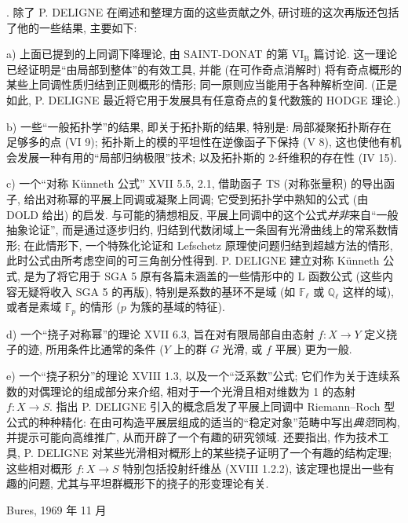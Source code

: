 . 除了 P. DELIGNE 在阐述和整理方面的这些贡献之外,
研讨班的这次再版还包括了他的一些结果, 主要如下:

\noindent a) 上面已提到的上同调下降理论,
由 SAINT-DONAT 的第 $\mathrm{VI}_{\mathrm B}$ 篇讨论.
这一理论已经证明是“由局部到整体”的有效工具,
并能 (在可作奇点消解时) 将有奇点概形的某些上同调性质归结到正则概形的情形;
同一原则应当能用于各种解析空间.
(正是如此, P. DELIGNE 最近将它用于发展具有任意奇点的复代数簇的 HODGE 理论.)

\noindent b) 一些“一般拓扑学”的结果, 即关于拓扑斯的结果, 特别是:
局部凝聚拓扑斯存在足够多的点 (VI 9);
拓扑斯上的模的平坦性在逆像函子下保持 (V 8),
这也使他有机会发展一种有用的“局部归纳极限”技术;
以及拓扑斯的 2-纤维积的存在性 (IV 15).

\noindent c) 一个“对称 Künneth 公式” XVII 5.5, 2.1,
借助函子 TS (对称张量积) 的导出函子,
给出对称幂的平展上同调或凝聚上同调;
它受到拓扑学中熟知的公式 (由 DOLD 给出) 的启发.
与可能的猜想相反, 平展上同调中的这个公式\emph{并非}来自“一般抽象论证”,
而是通过逐步归约, 归结到代数闭域上一条固有光滑曲线上的常系数情形;
在此情形下, 一个特殊化论证和 Lefschetz 原理使问题归结到超越方法的情形,
此时公式由所考虑空间的可三角剖分性得到.
P. DELIGNE 建立对称 Künneth 公式,
是为了将它用于 SGA 5 原有各篇未涵盖的一些情形中的 L 函数公式
(这些内容无疑将收入 SGA 5 的再版),
特别是系数的基环不是域 (如 $\mathbb F_\ell$ 或 $\mathbb Q_\ell$ 这样的域),
或者是素域 $\mathbb F_p$ 的情形 ($p$ 为簇的基域的特征).

\noindent d) 一个“挠子对称幂”的理论 XVII 6.3,
旨在对有限局部自由态射 $f:X\longrightarrow Y$ 定义挠子的迹,
所用条件比通常的条件 ($Y$ 上的群 $G$ 光滑, 或 $f$ 平展) 更为一般.

\noindent e) 一个“挠子积分”的理论 XVIII 1.3,
以及一个“泛系数”公式; 它们作为关于连续系数的对偶理论的组成部分来介绍,
相对于一个光滑且相对维数为 1 的态射 $f:X\longrightarrow S$.
指出 P. DELIGNE 引入的概念启发了平展上同调中 Riemann--Roch 型公式的种种精化:
在由可构造平展层组成的适当的“稳定对象”范畴中写出\emph{典范}同构,
并提示可能向高维推广, 从而开辟了一个有趣的研究领域.
还要指出, 作为技术工具,
P. DELIGNE 对某些光滑相对概形上的某些挠子证明了一个有趣的结构定理;
这些相对概形 $f:X\longrightarrow S$ 特别包括投射纤维丛 (XVIII 1.2.2),
该定理也提出一些有趣的问题,
尤其与平坦群概形下的挠子的形变理论有关.

\begin{flushright}
Bures, 1969 年 11 月
\end{flushright}


